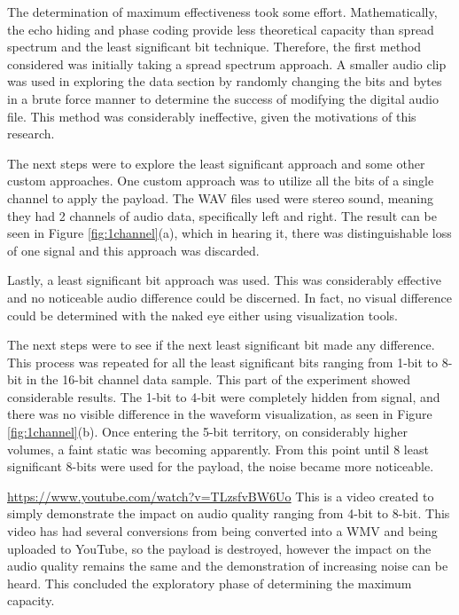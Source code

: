 \documentclass[letterpaper]{article}
\begin{document}
The determination of maximum effectiveness took some effort. Mathematically, the echo hiding and phase coding provide less theoretical capacity than spread spectrum and the least significant bit technique. Therefore, the first method considered was initially taking a spread spectrum approach. A smaller audio clip was used in exploring the data section by randomly changing the bits and bytes in a brute force manner to determine the success of modifying the digital audio file. This method was considerably ineffective, given the motivations of this research. 




The next steps were to explore the least significant approach and some other custom approaches. One custom approach was to utilize all the bits of a single channel to apply the payload. The WAV files used were stereo sound, meaning they had 2 channels of audio data, specifically left and right. The result can be seen in Figure \ref{fig:1channel}(a), which in hearing it, there was distinguishable loss of one signal and this approach was discarded. 

Lastly, a least significant bit approach was used. This was considerably effective and no noticeable audio difference could be discerned. In fact, no visual difference could be determined with the naked eye either using visualization tools. 



The next steps were to see if the next least significant bit made any difference. This process was repeated for all the least significant bits ranging from 1-bit to 8-bit in the 16-bit channel data sample. This part of the experiment showed considerable results. The 1-bit to 4-bit were completely hidden from signal, and there was no visible difference in the waveform visualization, as seen in Figure \ref{fig:1channel}(b). Once entering the 5-bit territory, on considerably higher volumes, a faint static was becoming apparently. From this point until 8 least significant 8-bits were used for the payload, the noise became more noticeable.

\href{https://www.youtube.com/watch?v=TLzsfvBW6Uo}{https://www.youtube.com/watch?v=TLzsfvBW6Uo} This is a video created to simply demonstrate the impact on audio quality ranging from 4-bit to 8-bit. This video has had several conversions from being converted into a WMV and being uploaded to YouTube, so the payload is destroyed, however the impact on the audio quality remains the same and the demonstration of increasing noise can be heard. This concluded the exploratory phase of determining the maximum capacity.
\end{document}
